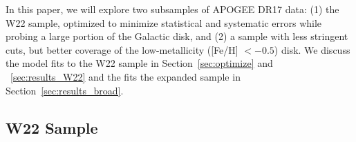 \documentclass[modern]{aastex631}
\begin{document}

In this paper, we will explore two subsamples of APOGEE DR17 data: (1) the W22 sample, optimized to minimize statistical and systematic errors while probing a large portion of the Galactic disk, and (2) a sample with less stringent cuts, but better coverage of the low-metallicity ([Fe/H] $< -0.5$) disk. We discuss the model fits to the W22 sample in Section~\ref{sec:optimize} and ~\ref{sec:results_W22} and the fits the expanded sample in Section~\ref{sec:results_broad}.

\subsection{W22 Sample}
\end{document}

